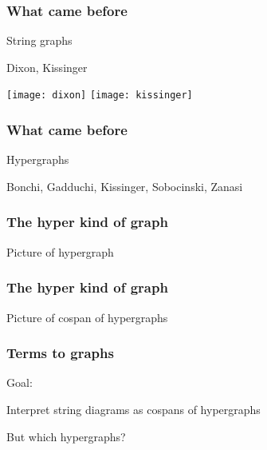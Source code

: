 \begin{frame}
    \frametitle{What came before}

    \pause
    \centering
    \LARGE
    String graphs

    \pause
    \normalsize
    \vspace{1em}
    Dixon, Kissinger

    \texttt{[image: dixon]}
    \texttt{[image: kissinger]}

\end{frame}

\begin{frame}
    \frametitle{What came before}

    \pause
    \centering
    \LARGE
    Hypergraphs
    \quad

    \pause
    \normalsize
    \vspace{1em}
    Bonchi, Gadduchi, Kissinger, Sobocinski, Zanasi

    \hypergraphpeople

\end{frame}

\begin{frame}
    \frametitle{The hyper kind of graph}

    Picture of hypergraph

\end{frame}

\begin{frame}
    \frametitle{The hyper kind of graph}

    Picture of cospan of hypergraphs

\end{frame}

\begin{frame}
    \frametitle{Terms to graphs}

    \centering
    \LARGE

    Goal:

    Interpret \alert{string diagrams} as \alert{cospans of hypergraphs}

    \vspace{1em}
    \pause

    But which hypergraphs?

\end{frame}

